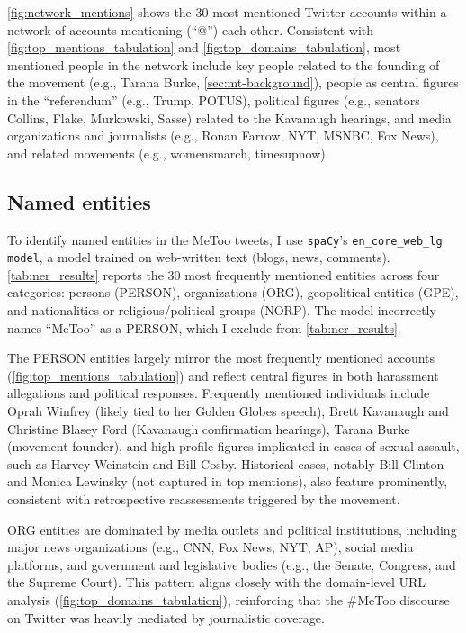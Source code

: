 \documentclass[manuscript,screen,nonacm,11pt,acm]{acmart}
\begin{document}
\begin{bibunit}
\cref{fig:network_mentions} shows the 30 most-mentioned Twitter accounts within a network of accounts mentioning (``@'') each other.
Consistent with \cref{fig:top_mentions_tabulation} and \cref{fig:top_domains_tabulation}, most mentioned people in the network include key people related to the founding of the movement (e.g., Tarana Burke, \cref{sec:mt-background}), people as central figures in the ``referendum'' (e.g., Trump, POTUS), political figures (e.g., senators Collins, Flake, Murkowski, Sasse) related to the Kavanaugh hearings, and media organizations and journalists (e.g., Ronan Farrow, NYT, MSNBC, Fox News), and related movements (e.g., womensmarch, timesupnow).

\subsection{Named entities}
To identify named entities in the MeToo tweets, I use \texttt{spaCy}'s \texttt{en\_core\_web\_lg model}, a model trained on web-written text (blogs, news, comments).
\cref{tab:ner_results} reports the 30 most frequently mentioned entities across four categories: persons (PERSON), organizations (ORG), geopolitical entities (GPE), and nationalities or religious/political groups (NORP).
The model incorrectly names ``MeToo'' as a PERSON, which I exclude from \cref{tab:ner_results}.

The PERSON entities largely mirror the most frequently mentioned accounts (\cref{fig:top_mentions_tabulation}) and reflect central figures in both harassment allegations and political responses.
Frequently mentioned individuals include Oprah Winfrey (likely tied to her Golden Globes speech), Brett Kavanaugh and Christine Blasey Ford (Kavanaugh confirmation hearings), Tarana Burke (movement founder), and high-profile figures implicated in cases of sexual assault, such as Harvey Weinstein and Bill Cosby.
Historical cases, notably Bill Clinton and Monica Lewinsky (not captured in top mentions), also feature prominently, consistent with retrospective reassessments triggered by the movement.

ORG entities are dominated by media outlets and political institutions, including major news organizations (e.g., CNN, Fox News, NYT, AP), social media platforms, and government and legislative bodies (e.g., the Senate, Congress, and the Supreme Court).
This pattern aligns closely with the domain-level URL analysis (\cref{fig:top_domains_tabulation}), reinforcing that the \#MeToo discourse on Twitter was heavily mediated by journalistic coverage.


\end{bibunit}
\end{document}

